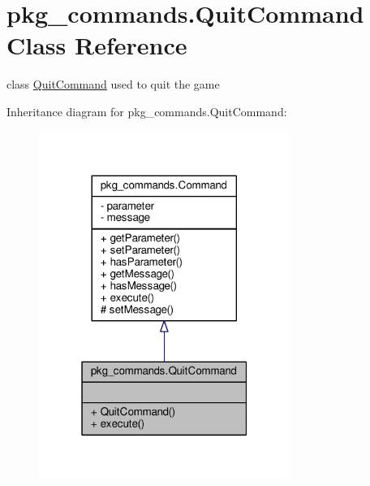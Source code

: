 \hypertarget{classpkg__commands_1_1QuitCommand}{\section{pkg\-\_\-commands.\-Quit\-Command Class Reference}
\label{classpkg__commands_1_1QuitCommand}
}


class \hyperlink{classpkg__commands_1_1QuitCommand}{Quit\-Command} used to quit the game  




Inheritance diagram for pkg\-\_\-commands.\-Quit\-Command\-:\nopagebreak
\begin{figure}[H]
\begin{center}
\leavevmode
\includegraphics[width=232pt]{classpkg__commands_1_1QuitCommand__inherit__graph}
\end{center}
\end{figure}


